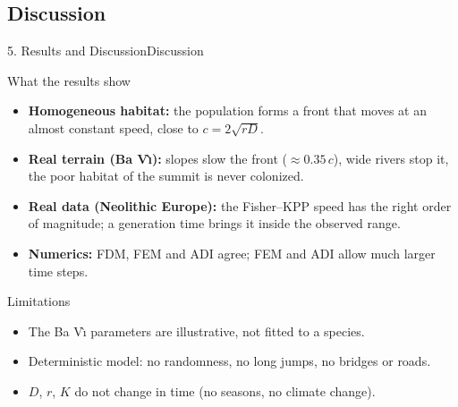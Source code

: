 \documentclass[10pt]{beamer}
\begin{document}
  \subsection{Discussion}
    \begin{frame}{5. Results and Discussion}{Discussion}
      \begin{block}{What the results show}
          \begin{itemize}
            \item \textbf{Homogeneous habitat:} the population forms a front that moves at an almost constant speed, close to $c = 2\sqrt{rD}$.
            \item \textbf{Real terrain (Ba V\`{\i}):} slopes slow the front ($\approx 0.35\,c$), wide rivers stop it, the poor habitat of the summit is never colonized.
            \item \textbf{Real data (Neolithic Europe):} the Fisher--KPP speed has the right order of magnitude; a generation time brings it inside the observed range.
            \item \textbf{Numerics:} FDM, FEM and ADI agree; FEM and ADI allow much larger time steps.
          \end{itemize}
      \end{block}
      \begin{block}{Limitations}
          \begin{itemize}
            \item The Ba V\`{\i} parameters are illustrative, not fitted to a species.
            \item Deterministic model: no randomness, no long jumps, no bridges or roads.
            \item $D$, $r$, $K$ do not change in time (no seasons, no climate change).
          \end{itemize}
      \end{block}
    \end{frame}
\end{document}
